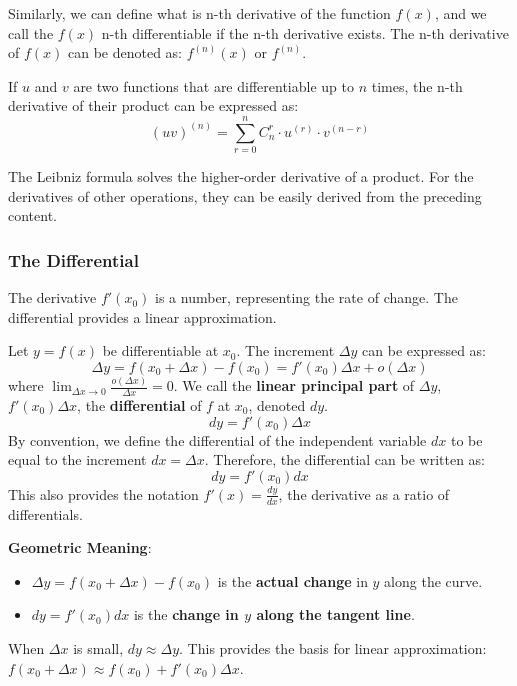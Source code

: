 Similarly, we can define what is n-th derivative of the function $f(x)$, and we call the $f(x)$ n-th differentiable if the n-th derivative exists. The n-th derivative of $f(x)$ can be denoted as: $f^{(n)}(x)$ or $f^{(n)}$.

\begin{theorem}
If $u$ and $v$ are two functions that are differentiable up to $n$ times, the n-th derivative of their product can be expressed as:
\[
(uv)^{(n)}=\sum_{r=0}^{n} C_{n}^{r}\cdot u^{(r)}\cdot v^{(n-r)}
\]

\end{theorem}

The Leibniz formula solves the higher-order derivative of a product. For the derivatives of other operations, they can be easily derived from the preceding content.

\subsubsection{The Differential}

The derivative $f'(x_0)$ is a number, representing the rate of change. The differential provides a linear approximation.

\begin{definition}[Differential]
Let $y = f(x)$ be differentiable at $x_0$. The increment $\Delta y$ can be expressed as:
\[
\Delta y = f(x_0 + \Delta x) - f(x_0) = f'(x_0)\Delta x + o(\Delta x)
\]
where $\lim_{\Delta x \to 0} \frac{o(\Delta x)}{\Delta x} = 0$.
We call the \textbf{linear principal part} of $\Delta y$, $f'(x_0)\Delta x$, the \textbf{differential} of $f$ at $x_0$, denoted $dy$.
\[
dy = f'(x_0) \Delta x
\]
By convention, we define the differential of the independent variable $dx$ to be equal to the increment $dx = \Delta x$.
Therefore, the differential can be written as:
\[
dy = f'(x_0) dx
\]
This also provides the notation $f'(x) = \frac{dy}{dx}$, the derivative as a ratio of differentials.
\end{definition}



\textbf{Geometric Meaning}:
\begin{itemize}
    \item $\Delta y = f(x_0 + \Delta x) - f(x_0)$ is the \textbf{actual change} in $y$ along the curve.
    \item $dy = f'(x_0) dx$ is the \textbf{change in $y$ along the tangent line}.
\end{itemize}
When $\Delta x$ is small, $dy \approx \Delta y$. This provides the basis for linear approximation: $f(x_0 + \Delta x) \approx f(x_0) + f'(x_0) \Delta x$.


